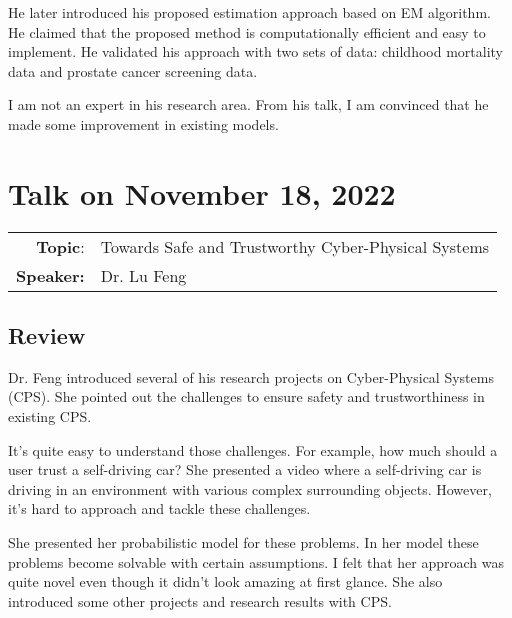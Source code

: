 \documentclass[11pt, oneside]{article}   	%
\begin{document}
He later introduced his proposed estimation approach based on EM algorithm. He claimed that the proposed method is computationally efficient and easy to implement. He validated his approach with two sets of data: childhood mortality data and prostate cancer screening data.

I am not an expert in his research area. From his talk, I am convinced that he made some improvement in existing models.

\newpage
\section{Talk on November 18, 2022}
\begin{tabularx} {\textwidth}{r X}
\textbf{Topic}: & Towards Safe and Trustworthy Cyber-Physical Systems\\
\textbf{Speaker:} & Dr. Lu Feng\\
\end{tabularx}


\subsection{Review}
Dr. Feng introduced several of his research projects on Cyber-Physical Systems (CPS). She pointed out the challenges to ensure safety and trustworthiness in existing CPS.

It's quite easy to understand those challenges. For example, how much should a user trust a self-driving car? She presented a video where a self-driving car is driving in an environment with various complex surrounding objects. However, it's hard to approach and tackle these challenges.

She presented her probabilistic model for these problems. In her model these problems become solvable with certain assumptions. I felt that her approach was quite novel even though it didn't look amazing at first glance. She also introduced some other projects and research results with CPS.
\end{document}
